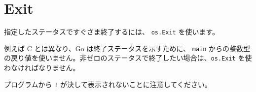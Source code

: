 \section{Exit}

指定したステータスですぐさま終了するには、 \texttt{os.Exit} を使います。



例えば C とは異なり、Go は終了ステータスを示すために、 \texttt{main} からの整数型の戻り値を使いません。非ゼロのステータスで終了したい場合は、\texttt{os.Exit} を使わなければなりません。



プログラムから \texttt{!} が決して表示されないことに注意してください。